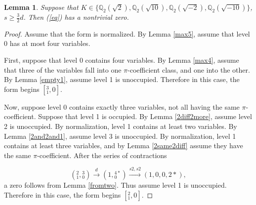 \documentclass[12pt]{amsart}
\newtheorem{lemma}{Lemma}
\begin{document}
\begin{lemma} \label{max3}
Suppose that $K \in \{\mathbb{Q}_2(\sqrt{2}), \mathbb{Q}_2(\sqrt{10}), \mathbb{Q}_2(\sqrt{-2}), \mathbb{Q}_2(\sqrt{-10})\}$, $s \ge \frac{3}{2}d$.  Then (\ref{eq}) has a nontrivial zero.
\end{lemma}
\begin{proof}
Assume that the form is normalized.  By Lemma \ref{max5}, assume that level 0 has at most four variables.  


First, suppose that level 0 contains four variables.  By Lemma \ref{max4}, assume that three of the variables fall into one $\pi$-coefficient class, and one into the other.  By Lemma \ref{empty1}, assume level 1 is unoccupied.  Therefore in this case, the form begins $[{}^{3}_{1},0]$.



Now, suppose level 0 contains exactly three variables, not all having the same $\pi$-coefficient.  Suppose that level 1 is occupied.  By Lemma \ref{2diff2more}, assume level 2 is unoccupied.  By normalization, level 1 contains at least two variables.  By Lemma \ref{2and2and1}, assume level 3 is unoccupied.  By normalization, level 1 contains at least three variables, and by Lemma \ref{2same2diff} assume they have the same $\pi$-coefficient.  After the series of contractions

$$({}^{2}_{1}, {}^{3}_{0}) \xrightarrow{d} (1, {}^{4*}_{0}) \xrightarrow{s2, s2} (1, 0, 0, 2*),$$
a zero follows from Lemma \ref{fromtwo}.  Thus assume level 1 is unoccupied.  Therefore in this case, the form begins $[{}^2_1,0]$.


\end{proof}
\end{document}

